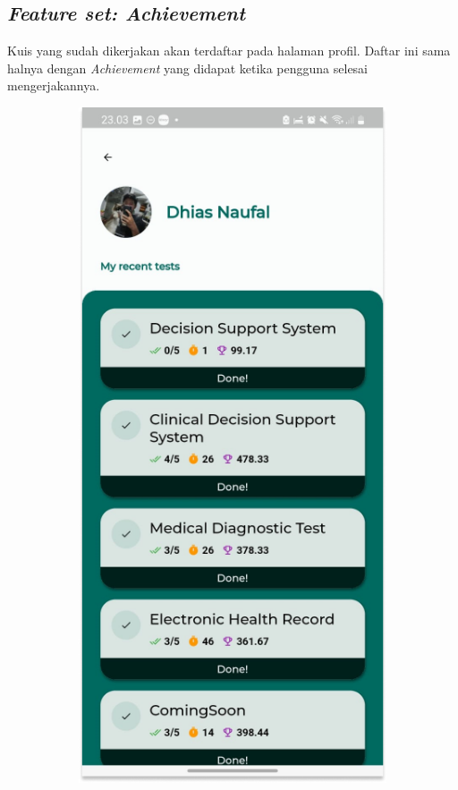 \subsection{\textit{Feature set: Achievement}}
Kuis yang sudah dikerjakan akan terdaftar pada halaman profil. Daftar ini sama halnya dengan \textit{Achievement} yang didapat ketika pengguna selesai mengerjakannya.
\begin{figure}[H]
	\centering
	\begin{subfigure}[b]{0.23\textwidth}
		\centering
	  \includegraphics[width=\linewidth]{contents/chapter-3/images/HF-profil.png}

\end{subfigure}
\end{figure}
